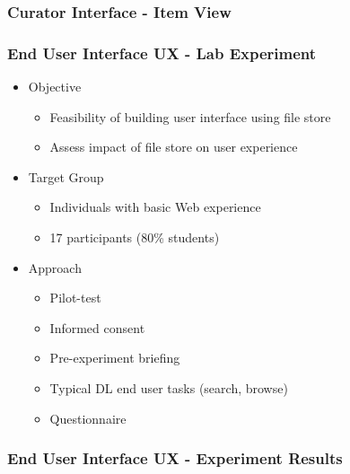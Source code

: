 \documentclass[xcolor=dvitex,t,11pt]{beamer}
\begin{document}
\begin{frame}[fragile]
\frametitle{Curator Interface - Item View}
\begin{figure}
\centering
{}
\end{figure}
\end{frame}

\begin{frame}[fragile]
\frametitle{End User Interface UX - Lab Experiment}
\begin{itemize}
\item<1-> Objective
\begin{itemize}
\item<2-> Feasibility of building user interface using file store
\item<3-> Assess impact of file store on user experience
\end{itemize}
\item<4-> Target Group
\begin{itemize}
\item<5-> Individuals with basic Web experience
\item<6-> 17 participants (80\% students)
\end{itemize}
\item<7-> Approach
\begin{itemize}
\item<8-> Pilot-test
\item<9-> Informed consent
\item<10-> Pre-experiment briefing
\item<11-> Typical DL end user tasks (search, browse)
\item<12-> Questionnaire
\end{itemize}
\end{itemize}
\end{frame}


\begin{frame}[fragile]
\frametitle{End User Interface UX - Experiment Results}
\centering

\end{frame}
\end{document}
